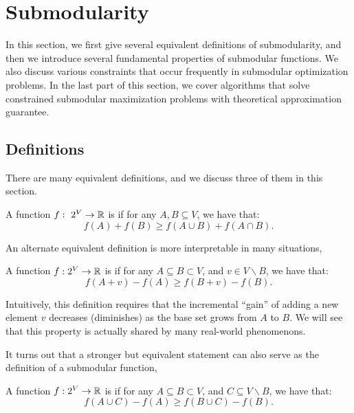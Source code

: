 \section{Submodularity}
\label{sec:submodularity}
In this section, we first give several equivalent definitions of submodularity, and then we introduce several fundamental properties of submodular functions. We also discuss various constraints that occur frequently in submodular optimization problems. In the last part of this section, we cover algorithms that solve constrained submodular maximization problems with theoretical approximation guarantee. 

\subsection{Definitions}
There are many equivalent definitions, and we discuss three of them in this section. 

\begin{definition}
  \label{def:sub-concave}
  A function $f:~2^V \rightarrow \mathbb{R}$ is  if for any $A, B \subseteq V$, we have that:
  \begin{equation}
    \label{eq:sub-concave}
    f(A) + f(B) \geq f(A \cup B) + f(A \cap B).
  \end{equation}
\end{definition}

An alternate equivalent definition is more interpretable in many situations,

\begin{definition}
  \label{def:sub-diminishing}
  A function $f: 2^V \rightarrow \mathbb{R}$ is  if for any $A \subseteq B \subset V$, and $v \in V\backslash B$, we have that:
  \begin{equation}
    \label{eq:sub-diminishing}
    f(A + v) - f(A) \geq f(B + v) - f(B).
  \end{equation}
\end{definition}

Intuitively, this definition requires that the incremental ``gain'' of adding a new element $v$ decreases (diminishes) as the base set grows from $A$ to $B$. We will see that this property is actually shared by many real-world phenomenons.

It turns out that a stronger but equivalent statement can also serve as the definition of a submodular function,

\begin{definition}
  \label{def:sub-diminishing-group}
  A function $f: 2^V \rightarrow \mathbb{R}$ is  if for any $A \subseteq B \subset V$, and $C \subseteq V\backslash B$, we have that:
  \begin{equation}
    \label{eq:sub-diminishing-group}
    f(A \cup C) - f(A) \geq f(B \cup C) - f(B).
  \end{equation}
\end{definition}


